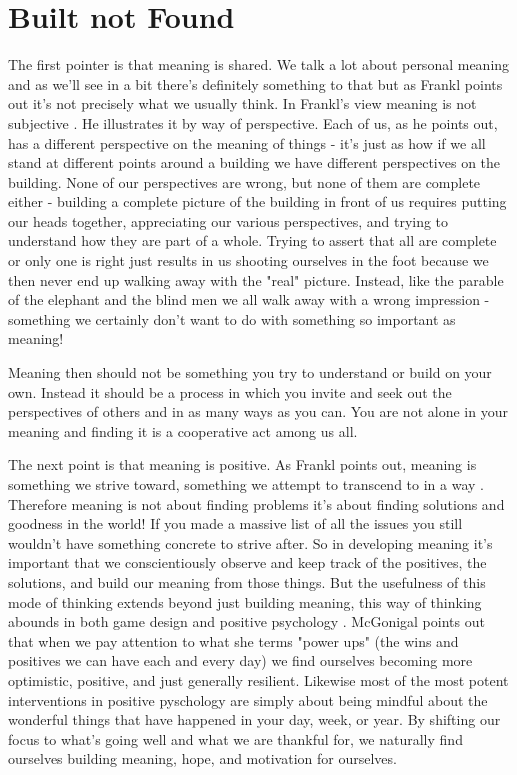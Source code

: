 \documentclass[11pt,a5paper]{book}
\begin{document}
\section{Built not Found}
The first pointer is that meaning is shared. We talk a lot about personal meaning and as we'll see in a bit there's definitely something to that but as Frankl points out it's not precisely what we usually think. In Frankl's view meaning is not subjective \cite{frankl}. He illustrates it by way of perspective. Each of us, as he points out, has a different perspective on the meaning of things - it's just as how if we all stand at different points around a building we have different perspectives on the building. None of our perspectives are wrong, but none of them are complete either - building a complete picture of the building in front of us requires putting our heads together, appreciating our various perspectives, and trying to understand how they are part of a whole. Trying to assert that all are complete or only one is right just results in us shooting ourselves in the foot because we then never end up walking away with the "real" picture. Instead, like the parable of the elephant and the blind men we all walk away with a wrong impression - something we certainly don't want to do with something so important as meaning! 
\newline

Meaning then should not be something you try to understand or build on your own. Instead it should be a process in which you invite and seek out the perspectives of others and in as many ways as you can. You are not alone in your meaning and finding it is a cooperative act among us all. 
\newline

The next point is that meaning is positive. As Frankl points out, meaning is something we strive toward, something we attempt to transcend to in a way \cite{frankl}. Therefore meaning is not about finding problems it's about finding solutions and goodness in the world! If you made a massive list of all the issues you still wouldn't have something concrete to strive after. So in developing meaning it's important that we conscientiously observe and keep track of the positives, the solutions, and build our meaning from those things. But the usefulness of this mode of thinking extends beyond just building meaning, this way of thinking abounds in both game design \cite{superbetter} and positive psychology \cite{seligman}. McGonigal points out that when we pay attention to what she terms "power ups" (the wins and positives we can have each and every day) we find ourselves becoming more optimistic, positive, and just generally resilient. Likewise most of the most potent interventions in positive pyschology are simply about being mindful about the wonderful things that have happened in your day, week, or year. By shifting our focus to what's going well and what we are thankful for, we naturally find ourselves building meaning, hope, and motivation for ourselves. 
\newline
\end{document}
